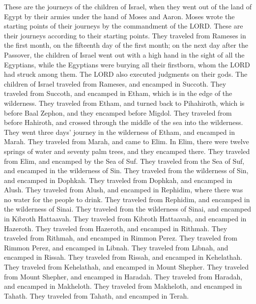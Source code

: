 \mychapter{} \myverse*{}These are the journeys of the children of Israel, when they went
out of the land of Egypt by their armies under the hand of Moses and Aaron.
\myverse{}Moses wrote the starting points of their journeys by the commandment of the
LORD. These are their journeys according to their starting points.
\myverse{}They traveled from Rameses in the first month, on the fifteenth day of the
first month; on the next day after the Passover, the children of Israel went out with a high hand in the
sight of all the Egyptians,
\myverse{}while the Egyptians were burying all their firstborn, whom the LORD had struck
among them. The LORD also executed judgments on their gods.
\myverse{}The children of Israel traveled from Rameses, and encamped in Succoth.
\myverse{}They traveled from Succoth, and encamped in Etham, which is in the edge of
the wilderness.
\myverse{}They traveled from Etham, and turned back to Pihahiroth, which is before Baal
Zephon, and they encamped before Migdol.
\myverse{}They traveled from before Hahiroth, and crossed through the middle of the sea
into the wilderness. They went three days’ journey in the wilderness of Etham, and encamped in Marah.
\myverse{}They traveled from Marah, and came to Elim. In Elim, there were twelve springs
of water and seventy palm trees, and they encamped there.
\myverse{}They traveled from Elim, and encamped by the Sea of Suf.
\myverse{}They traveled from the Sea of Suf, and encamped in the wilderness of Sin.
\myverse{}They traveled from the wilderness of Sin, and encamped in Dophkah.
\myverse{}They traveled from Dophkah, and encamped in Alush.
\myverse{}They traveled from Alush, and encamped in Rephidim, where there was no water
for the people to drink.
\myverse{}They traveled from Rephidim, and encamped in the wilderness of Sinai.
\myverse{}They traveled from the wilderness of Sinai, and encamped in Kibroth Hattaavah.
\myverse{}They traveled from Kibroth Hattaavah, and encamped in Hazeroth.
\myverse{}They traveled from Hazeroth, and encamped in Rithmah.
\myverse{}They traveled from Rithmah, and encamped in Rimmon Perez.
\myverse{}They traveled from Rimmon Perez, and encamped in Libnah.
\myverse{}They traveled from Libnah, and encamped in Rissah.
\myverse{}They traveled from Rissah, and encamped in Kehelathah.
\myverse{}They traveled from Kehelathah, and encamped in Mount Shepher.
\myverse{}They traveled from Mount Shepher, and encamped in Haradah.
\myverse{}They traveled from Haradah, and encamped in Makheloth.
\myverse{}They traveled from Makheloth, and encamped in Tahath.
\myverse{}They traveled from Tahath, and encamped in Terah.

